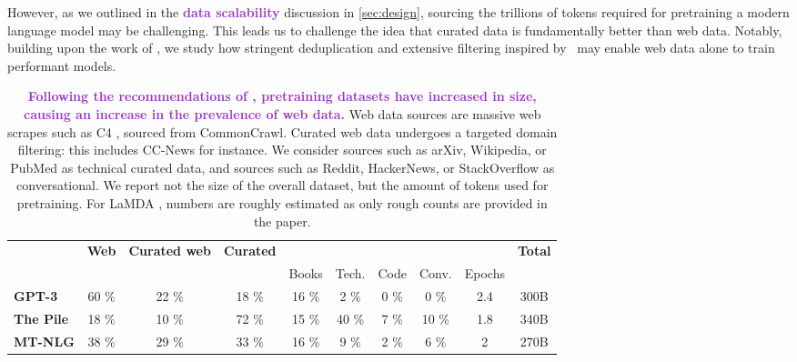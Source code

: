 \documentclass{article}
\DeclareRobustCommand{\data}[1]{\textcolor{DarkOrchid}{#1}}
\begin{document}
However, as we outlined in the \data{\textbf{data scalability}} discussion in \cref{sec:design}, sourcing the trillions of tokens required for pretraining a modern language model may be challenging. This leads us to challenge the idea that curated data is fundamentally better than web data. Notably, building upon the work of \citet{lee2022deduplicating}, we study how stringent deduplication and extensive filtering inspired by~\citet{gopher} may enable web data alone to train performant models.

\begin{table}[b]
\centering
\caption{\data{\textbf{Following the recommendations of \citet{hoffmann2022training}, pretraining datasets have increased in size, causing an increase in the prevalence of web data.}} Web data sources are massive web scrapes such as C4 \citep{raffel2019t5}, sourced from CommonCrawl. Curated web data undergoes a targeted domain filtering: this includes CC-News \citep{Hamborg2017} for instance. We consider sources such as arXiv, Wikipedia, or PubMed as technical curated data, and sources such as Reddit, HackerNews, or StackOverflow as conversational. We report not the size of the overall dataset, but the amount of tokens used for pretraining. For LaMDA \citep{thoppilan2022lamda}, numbers are roughly estimated as only rough counts are provided in the paper. }
\vspace{0.1in}
    \label{tab:sota_mixes}
\begin{small}
\begin{tabular}{lccccccccc}
\toprule
                    & \textbf{Web} & \textbf{Curated web} & \textbf{Curated} &               &           &               &               &  & \textbf{Total} \\
                    &              &                      &                  & Books         & Tech. & Code          & Conv. &  Epochs                           &                \\
\midrule
\textbf{GPT-3}     & 60 \%        & 22 \%                & 18 \%            & 16 \%         & 2 \%      & 0 \%          & 0 \%          & 2.4                         & 300B            \\
\textbf{The Pile}   & 18 \%        & 10 \%                & 72 \%            & 15 \%         & 40 \%     & 7 \%          & 10 \%         & 1.8                        & 340B            \\
\textbf{MT-NLG}     & 38 \%      & 29 \%              & 33 \%          & 16 \%       & 9 \%    & 2 \%        & 6 \%        & 2                        & 270B            \\

\end{tabular}
\end{small}
\end{table}
\end{document}
